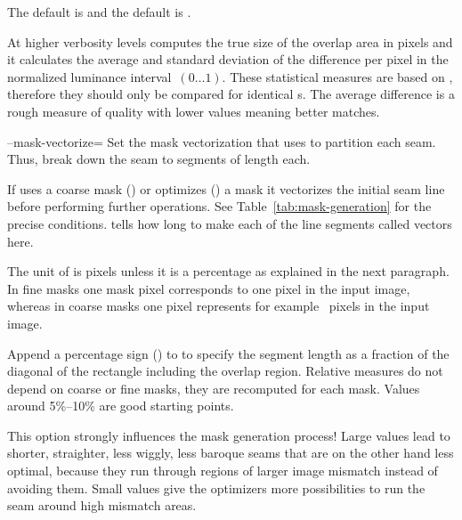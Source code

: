 \begin{codelist}
  The default  is
   and the default
   is
  .

  At higher verbosity levels \App{} computes the true size of the
  overlap area in pixels and it calculates the average and standard
  deviation of the difference per pixel in the normalized luminance
  interval~$(0\dots1)$.  These statistical measures are based on
  , therefore they should only be compared for
  identical s.  The average difference is a rough
  measure of quality with
  lower values meaning better matches.


  \label{opt:mask-vectorize}%
\item[--mask-vectorize=\metavar{DISTANCE}]\itemend Set the mask
  vectorization 
  that \App{} uses to partition each seam.  Thus, break down the seam
  to segments of length  each.

  If \App{} uses a coarse mask () or \App{}
  optimizes () a mask it vectorizes the initial
  seam line before performing further operations.  See
  Table~\ref{tab:mask-generation} for the precise conditions.
   tells \App{} how long to make each of the line
  segments called vectors here.

  The unit of  is pixels unless it is a percentage
  as explained in the next paragraph.  In fine masks one mask pixel
  corresponds to one pixel in the input image, whereas in coarse masks
  one pixel represents for example
  ~pixels in the input image.

  Append a percentage sign (\sample{\%}) to  to
  specify the segment length as a fraction of the diagonal of the
  rectangle including the overlap region.  Relative measures do not
  depend on coarse or fine masks, they are recomputed for each mask.
  Values around 5\%--10\% are good starting points.

  This option strongly influences the mask generation process!  Large
   values lead to shorter, straighter, less wiggly,
  less baroque seams that are on the other hand less optimal, because
  they run through regions of larger image mismatch instead of
  avoiding them.  Small  values give the optimizers
  more possibilities to run the seam around high mismatch areas.


\end{codelist}
